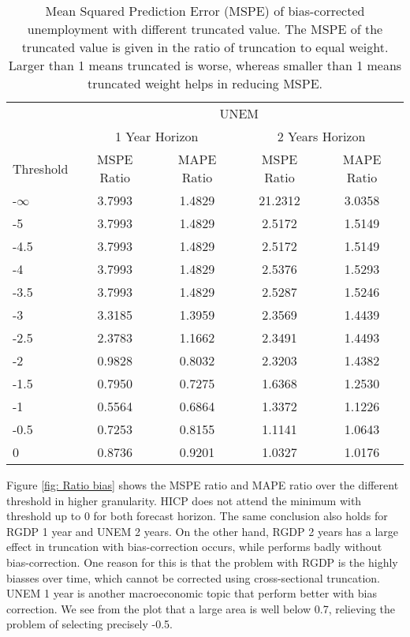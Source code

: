 \documentclass[11pt]{article}
\begin{document}
\begin{table}[!h]
\centering
\caption{Mean Squared Prediction Error (MSPE) of bias-corrected unemployment with different truncated value. The MSPE of the truncated value is given in the ratio of truncation to equal weight. Larger than 1 means truncated is worse, whereas smaller than 1 means truncated weight helps in reducing MSPE.}
\label{tab: MSPE UNEM bias}
\begin{tabular}{lcccc}
	\hline
	                                                &                        \multicolumn{4}{c}{UNEM}                         \\
	\cmidrule(lr){2-5}                              & \multicolumn{2}{c}{1 Year Horizon} & \multicolumn{2}{c}{2 Years Horizon} \\
	\cmidrule(lr){2-3} \cmidrule(lr){4-5}
	Threshold & MSPE Ratio & MAPE Ratio  & MSPE Ratio & MAPE Ratio  \\ \hline
-$\infty$ & 3.7993 & 1.4829 & 21.2312 & 3.0358\\ 
-5 & 3.7993 & 1.4829 & 2.5172 & 1.5149\\ 
-4.5 & 3.7993 & 1.4829 & 2.5172 & 1.5149\\ 
-4 & 3.7993 & 1.4829 & 2.5376 & 1.5293\\ 
-3.5 & 3.7993 & 1.4829 & 2.5287 & 1.5246\\ 
-3 & 3.3185 & 1.3959 & 2.3569 & 1.4439\\ 
-2.5 & 2.3783 & 1.1662 & 2.3491 & 1.4493\\ 
-2 & 0.9828 & 0.8032 & 2.3203 & 1.4382\\ 
-1.5 & 0.7950 & 0.7275 & 1.6368 & 1.2530\\ 
-1 & 0.5564 & 0.6864 & 1.3372 & 1.1226\\ 
-0.5 & 0.7253 & 0.8155 & 1.1141 & 1.0643\\ 
0 & 0.8736 & 0.9201 & 1.0327 & 1.0176\\ \hline
\end{tabular}
\end{table}

Figure \ref{fig: Ratio bias} shows the MSPE ratio and MAPE ratio over the different threshold in higher granularity. HICP does not attend the minimum with threshold up to 0 for both forecast horizon. The same conclusion also holds for RGDP 1 year and UNEM 2 years. On the other hand, RGDP 2 years has a large effect in truncation with bias-correction occurs, while performs badly without bias-correction. One reason for this is that the problem with RGDP is the highly biasses over time, which cannot be corrected using cross-sectional truncation. UNEM 1 year is another macroeconomic topic that perform better with bias correction. We see from the plot that a large area is well below 0.7, relieving the problem of selecting precisely -0.5.
\end{document}
